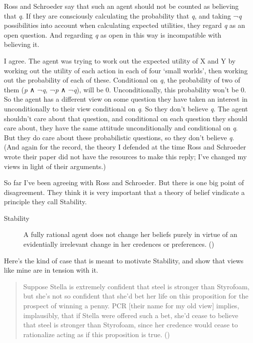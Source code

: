 \documentclass[
  12pt,
  letterpaper,
]{scrbook}
\begin{document}
Ross and Schroeder say that such an agent should not be counted as
believing that \emph{q}. If they are consciously calculating the
probability that \emph{q}, and taking ¬\emph{q} possibilities into
account when calculating expected utilities, they regard \emph{q} as an
open question. And regarding \emph{q} as open in this way is
incompatible with believing it.

I agree. The agent was trying to work out the expected utility of X and
Y by working out the utility of each action in each of four `small
worlds', then working out the probability of each of these. Conditional
on \emph{q}, the probability of two of them (\emph{p} ∧ ¬\emph{q},
¬\emph{p} ∧ ¬\emph{q}), will be 0. Unconditionally, this probability
won't be 0. So the agent has a different view on some question they have
taken an interest in unconditionally to their view conditional on
\emph{q}. So they don't believe \emph{q}. The agent shouldn't care about
that question, and conditional on each question they should care about,
they have the same attitude unconditionally and conditional on \emph{q}.
But they do care about these probabilistic questions, so they don't
believe \emph{q}. (And again for the record, the theory I defended at
the time Ross and Schroeder wrote their paper did not have the resources
to make this reply; I've changed my views in light of their arguments.)

So far I've been agreeing with Ross and Schroeder. But there is one big
point of disagreement. They think it is very important that a theory of
belief vindicate a principle they call Stability.

\begin{description}
\item[Stability]
A fully rational agent does not change her beliefs purely in virtue of
an evidentially irrelevant change in her credences or preferences.
()
\end{description}

Here's the kind of case that is meant to motivate Stability, and show
that views like mine are in tension with it.

\begin{quote}
Suppose Stella is extremely confident that steel is stronger than
Styrofoam, but she's not so confident that she'd bet her life on this
proposition for the prospect of winning a penny. PCR {[}their name for
my old view{]} implies, implausibly, that if Stella were offered such a
bet, she'd cease to believe that steel is stronger than Styrofoam, since
her credence would cease to rationalize acting as if this proposition is
true. ()
\end{quote}
\end{document}
